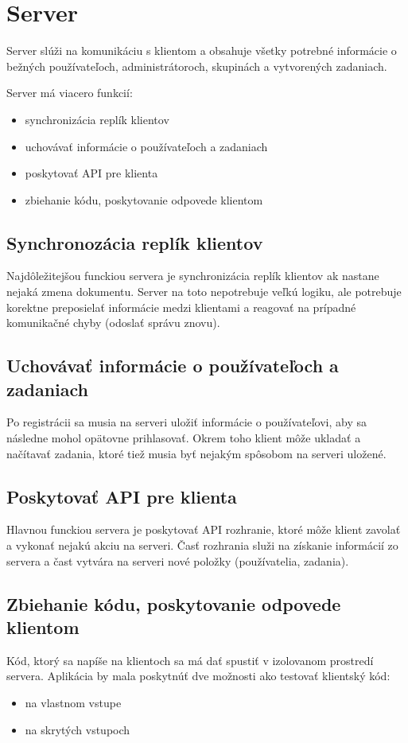 \section{Server}
Server slúži na komunikáciu s klientom a obsahuje všetky potrebné informácie o bežných
používateľoch, administrátoroch, skupinách a vytvorených zadaniach.

Server má viacero funkcií:
\begin{itemize}
\item synchronizácia replík klientov
\item uchovávať informácie o používateľoch a zadaniach
\item poskytovať API pre klienta
\item zbiehanie kódu, poskytovanie odpovede klientom
\end{itemize}

\subsection{Synchronozácia replík klientov}
Najdôležitejšou funckiou servera je synchronizácia replík klientov ak nastane nejaká zmena
dokumentu. Server na toto nepotrebuje veľkú logiku, ale potrebuje korektne preposielať informácie
medzi klientami a reagovať na prípadné komunikačné chyby (odoslať správu znovu).

\subsection{Uchovávať informácie o používateľoch a zadaniach}
Po registrácii sa musia na serveri uložiť informácie o používateľovi, aby sa následne mohol opätovne
prihlasovať. Okrem toho klient môže ukladať a načítavať zadania, ktoré tiež musia byť nejakým
spôsobom na serveri uložené.

\subsection{Poskytovať API pre klienta}
Hlavnou funckiou servera je poskytovať API rozhranie, ktoré môže klient zavolať a vykonať nejakú
akciu na serveri. Časť rozhrania služi na získanie informácií zo servera a čast vytvára
na serveri nové položky (používatelia, zadania).

\subsection{Zbiehanie kódu, poskytovanie odpovede klientom}
Kód, ktorý sa napíše na klientoch sa má dať spustiť v izolovanom prostredí servera. Aplikácia by
mala poskytnúť dve možnosti ako testovať klientský kód:
\begin{itemize}
\item na vlastnom vstupe
\item na skrytých vstupoch
\end{itemize}

